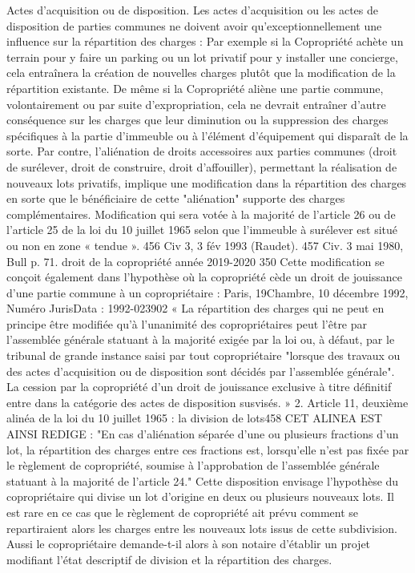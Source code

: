 Actes d'acquisition ou de disposition.
Les actes d'acquisition ou les actes de disposition de parties communes ne doivent avoir qu'exceptionnellement une influence sur la répartition des charges :
Par exemple si la Copropriété achète un terrain pour y faire un parking ou un lot privatif pour y installer une concierge, cela entraînera la création de nouvelles charges plutôt que la modification de la répartition existante.
De même si la Copropriété aliène une partie commune, volontairement ou par suite d’expropriation, cela ne devrait entraîner d’autre conséquence sur les charges que leur diminution ou la suppression des charges spécifiques à la partie d’immeuble ou à l’élément d’équipement qui disparaît de la sorte.
Par contre, l'aliénation de droits accessoires aux parties communes (droit de surélever, droit de construire, droit d'affouiller), permettant la réalisation de nouveaux lots privatifs, implique une modification dans la répartition des charges en sorte que le bénéficiaire de cette "aliénation" supporte des charges complémentaires. Modification qui sera votée à la majorité de l'article 26 ou de l’article 25 de la loi du 10 juillet 1965 selon que l’immeuble à surélever est situé ou non en zone « tendue ».
456 Civ 3\degres, 3 fév 1993 (Raudet).
457 Civ. 3 mai 1980, Bull  p. 71.
droit de la copropriété année 2019-2020
350
Cette modification se conçoit également dans l’hypothèse où la copropriété cède un droit de jouissance d’une partie commune à un copropriétaire : Paris, 19\degres Chambre, 10 décembre 1992, Numéro JurisData : 1992-023902
« La répartition des charges qui ne peut en principe être modifiée qu'à l'unanimité des copropriétaires peut l'être par l'assemblée générale statuant à la majorité exigée par la loi ou, à défaut, par le tribunal de grande instance saisi par tout copropriétaire "lorsque des travaux ou des actes d'acquisition ou de disposition sont décidés par l'assemblée générale". La cession par la copropriété d'un droit de jouissance exclusive à titre définitif entre dans la catégorie des actes de disposition susvisés. »
2. Article 11, deuxième alinéa de la loi du 10 juillet 1965 : la division de lots458
CET ALINEA EST AINSI REDIGE :
"En cas d'aliénation séparée d'une ou plusieurs fractions d'un lot, la répartition des charges entre ces fractions est, lorsqu'elle n'est pas fixée par le règlement de copropriété, soumise à l'approbation de l'assemblée générale statuant à la majorité de l'article 24."
Cette disposition envisage l'hypothèse du copropriétaire qui divise un lot d'origine en deux ou plusieurs nouveaux lots. Il est rare en ce cas que le règlement de copropriété ait prévu comment se repartiraient alors les charges entre les nouveaux lots issus de cette subdivision. Aussi le copropriétaire demande-t-il alors à son notaire d'établir un projet modifiant l'état descriptif de division et la répartition des charges.

